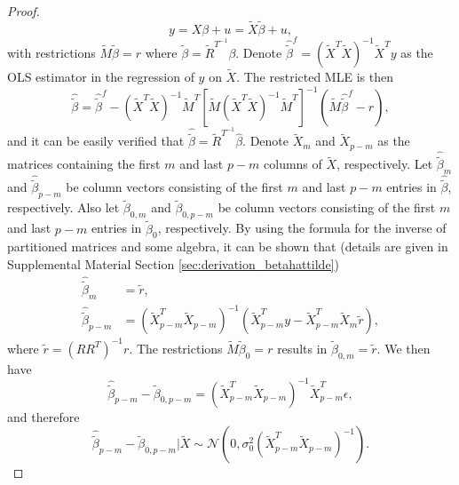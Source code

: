 \begin{proof}
\begin{equation*}
y = X \beta + u = \tilde{X} \tilde{\beta} + u,
\end{equation*}
with restrictions $\tilde{M} \tilde{\beta} = r$ where $\tilde{\beta} = \tilde{R}^{T^{-1}} \beta$. Denote $\hat{\tilde{\beta}}^f = (\tilde{X}^T \tilde{X})^{-1}\tilde{X}^Ty$ as the OLS estimator in the regression of $y$ on $\tilde{X}$. The restricted MLE is then
\begin{equation*}
\hat{\tilde{\beta}} = \hat{\tilde{\beta}}^f - \left( \tilde{X}^T \tilde{X} \right)^{-1} \tilde{M}^T \left[ \tilde{M} (\tilde{X}^T \tilde{X})^{-1} \tilde{M}^T \right]^{-1} \left( \tilde{M} \hat{\tilde{\beta}}^f - r \right),
\end{equation*}
and it can be easily verified that $\hat{\tilde{\beta}} = \tilde{R}^{T^{-1}} \hat{\beta}$. Denote $\tilde{X}_m$ and $\tilde{X}_{p-m}$ as the matrices containing the first $m$ and last $p-m$ columns of $\tilde{X}$, respectively. Let $\hat{\tilde{\beta}}_{m}$ and $\hat{\tilde{\beta}}_{p-m}$ be column vectors consisting of the first $m$ and last $p-m$ entries in $\hat{\tilde{\beta}}$, respectively. Also let $\tilde{\beta}_{0,m}$ and $\tilde{\beta}_{0,p-m}$ be column vectors consisting of the first $m$ and last $p-m$ entries in $\tilde{\beta}_0$, respectively. By using the formula for the inverse of partitioned matrices and some algebra, it can be shown that (details are given in Supplemental Material Section \ref{sec:derivation_betahattilde})
\begin{equation}
\begin{aligned}
\hat{\tilde{\beta}}_m &= \tilde{r},\\
\hat{\tilde{\beta}}_{p-m} &= \left( \tilde{X}_{p-m}^T \tilde{X}_{p-m} \right)^{-1} \left( \tilde{X}_{p-m}^Ty - \tilde{X}_{p-m}^T\tilde{X}_{m}\tilde{r} \right),
\end{aligned}
\label{eq:betahat_tilde_partition}
\end{equation}
where $\tilde{r} = (R R^T)^{-1}r$. The restrictions $\tilde{M}\tilde{\beta}_0=r$ results in $\tilde{\beta}_{0,m} = \tilde{r}$. We then have 
\begin{equation*}
\hat{\tilde{\beta}}_{p-m} - \tilde{\beta}_{0,p-m} = \left( \tilde{X}_{p-m}^T \tilde{X}_{p-m} \right)^{-1} \tilde{X}_{p-m} ^T \epsilon,
\end{equation*}
and therefore 
\begin{equation*}
\hat{\tilde{\beta}}_{p-m} - \tilde{\beta}_{0,p-m} \big | \tilde{X} \sim \mathcal{N} \left(0, \sigma_0^2 \left( \tilde{X}_{p-m}^T \tilde{X}_{p-m} \right)^{-1} \right).

\end{equation*}
\end{proof}
